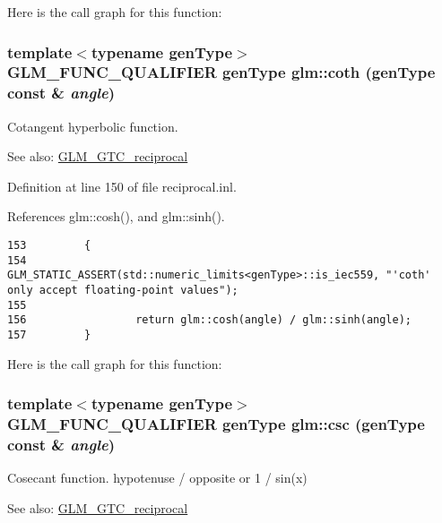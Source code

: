 Here is the call graph for this function:\hypertarget{group__gtc__reciprocal_g8bc5d51e10b478b061a071eb91258d35}{
\subsubsection[coth]{\setlength{\rightskip}{0pt plus 5cm}template$<$typename genType$>$ GLM\_\-FUNC\_\-QUALIFIER genType glm::coth (genType const \& {\em angle})}}
\label{group__gtc__reciprocal_g8bc5d51e10b478b061a071eb91258d35}


Cotangent hyperbolic function.

\begin{Desc}
\item[See also:]\hyperlink{group__gtc__reciprocal}{GLM\_\-GTC\_\-reciprocal} \end{Desc}


Definition at line 150 of file reciprocal.inl.

References glm::cosh(), and glm::sinh().

\begin{Code}\begin{verbatim}153         {
154                 GLM_STATIC_ASSERT(std::numeric_limits<genType>::is_iec559, "'coth' only accept floating-point values");
155 
156                 return glm::cosh(angle) / glm::sinh(angle);
157         }
\end{verbatim}
\end{Code}




Here is the call graph for this function:\hypertarget{group__gtc__reciprocal_gdadd7293102fe18951a4acb4df1455a8}{
\subsubsection[csc]{\setlength{\rightskip}{0pt plus 5cm}template$<$typename genType$>$ GLM\_\-FUNC\_\-QUALIFIER genType glm::csc (genType const \& {\em angle})}}
\label{group__gtc__reciprocal_gdadd7293102fe18951a4acb4df1455a8}


Cosecant function. hypotenuse / opposite or 1 / sin(x)

\begin{Desc}
\item[See also:]\hyperlink{group__gtc__reciprocal}{GLM\_\-GTC\_\-reciprocal} \end{Desc}



